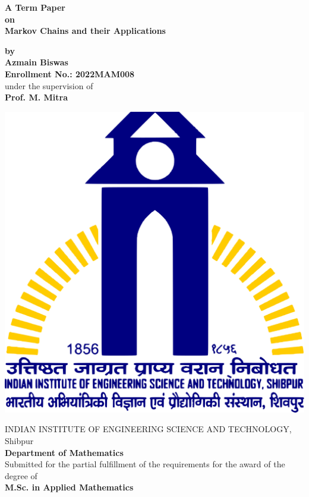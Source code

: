 \begin{titlepage}
    \thispagestyle{empty}
    \begin{center}

        \vspace{1cm}

        \Large{\textbf{A Term Paper\\ on}}\\
        \vspace{1cm}
        \huge{\textbf{Markov Chains and their Applications}}

        \vspace{1cm}
        \large{\textbf{by}}\\ 
        \Large{\textbf{Azmain Biswas}}\\ 
        \Large{\textbf{Enrollment No.: 2022MAM008}}\\ 
        \Large{under the supervision of}\\ 
        \Large{\textbf{Prof. M. Mitra}}

        \vspace{3cm}

        \includegraphics[scale = 0.09]{pic/IIEST_Shibpur_Logo.svg.png}

        \vspace{2cm}

        \Large{{
                INDIAN INSTITUTE OF ENGINEERING SCIENCE AND TECHNOLOGY, Shibpur\\ 
                \textbf{Department of Mathematics}
        }}\\
        \vspace*{2cm}
        \large{{Submitted for the partial fulfillment of the requirements for the award of the degree of}}\\
        \Large{\textbf{M.Sc. in Applied Mathematics}}
    \end{center}
\end{titlepage}
